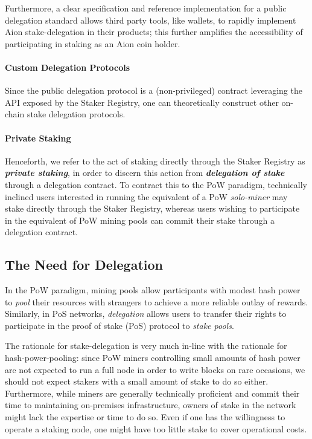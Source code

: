 Furthermore, a clear specification and reference implementation for a public delegation standard allows third party tools, like wallets, to rapidly implement Aion stake-delegation in their products; this further amplifies the accessibility of participating in staking as an Aion coin holder. 
    
\paragraph*{Custom Delegation Protocols}
Since the public delegation protocol is a (non-privileged) contract leveraging the API exposed by the Staker Registry, one can theoretically construct other on-chain stake delegation protocols. 

\paragraph*{Private Staking}
Henceforth, we refer to the act of staking directly through the Staker Registry as \textit{\textbf{private staking}}, in order to discern this action from \textbf{\textit{delegation of stake}} through a delegation contract. To contract this to the PoW paradigm, technically inclined users interested in running the equivalent of a PoW \textit{solo-miner} may stake directly through the Staker Registry, whereas users wishing to participate in the equivalent of PoW mining pools can commit their stake through a delegation contract.  

\subsection{The Need for Delegation} \label{delegation_overview}
In the PoW paradigm, mining pools allow participants with modest hash power to \textit{pool} their resources with strangers to achieve a more reliable outlay of rewards. Similarly, in PoS networks, \textit{delegation} allows users to transfer their rights to participate in the proof of stake (PoS) protocol to \textit{stake pools}. 

The rationale for stake-delegation is very much in-line with the rationale for hash-power-pooling: since PoW miners controlling small amounts of hash power are not expected to run a full node in order to write blocks on rare occasions, we should not expect stakers with a small amount of stake to do so either. Furthermore, while miners are generally technically proficient and commit their time to maintaining on-premises infrastructure, owners of stake in the network might lack the expertise or time to do so. Even if one has the willingness to operate a staking node, one might have too little stake to cover operational costs. 

